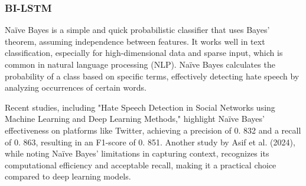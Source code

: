 \subsubsection{BI-LSTM}

\noindent
Naïve Bayes is a simple and quick probabilistic classifier that uses Bayes' theorem, assuming independence between features. It works well in text classification, especially for high-dimensional data and sparse input, which is common in natural language processing (NLP). Naïve Bayes calculates the probability of a class based on specific terms, effectively detecting hate speech by analyzing occurrences of certain words.

Recent studies, including "Hate Speech Detection in Social Networks using Machine Learning and Deep Learning Methods," highlight Naïve Bayes' effectiveness on platforms like Twitter, achieving a precision of 0. 832 and a recall of 0. 863, resulting in an F1-score of 0. 851. Another study by Asif et al. (2024), while noting Naïve Bayes' limitations in capturing context, recognizes its computational efficiency and acceptable recall, making it a practical choice compared to deep learning models.
